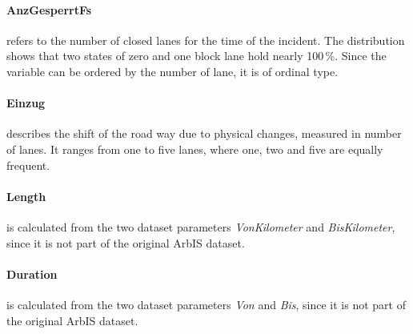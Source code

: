 \paragraph{AnzGesperrtFs} refers to the number of closed lanes for the time of the incident. The distribution shows that two states of zero and one block lane hold nearly 100\,\%. Since the variable can be ordered by the number of lane, it is of ordinal type.

\paragraph{Einzug} describes the shift of the road way due to physical changes, measured in number of lanes. It ranges from one to five lanes, where one, two and five are equally frequent. 

\paragraph{Length} is calculated from the two dataset parameters \textit{VonKilometer} and \textit{BisKilometer}, since it is not part of the original ArbIS dataset. 

\paragraph{Duration} is calculated from the two dataset parameters \textit{Von} and \textit{Bis}, since it is not part of the original ArbIS dataset.

